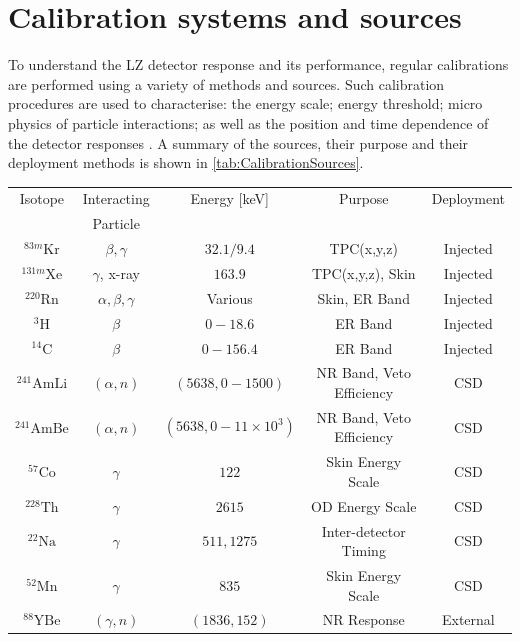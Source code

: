 \section{Calibration systems and sources}
To understand the LZ detector response and its performance, regular calibrations are performed using a variety of methods and sources. Such calibration procedures are used to characterise: the energy scale; energy threshold; micro physics of particle interactions; as well as the position and time dependence of the detector responses \cite{LZ:2024bsz}. A summary of the sources, their purpose and their deployment methods is shown in \autoref{tab:CalibrationSources}.
\begin{table}[h!]
    \centering
    \begin{tabular}{|c|c|c|c|c|}
         \hline
         Isotope & Interacting & Energy [keV] & Purpose & Deployment \\
         & Particle & & & \\
         \hline
         $^{83m}\text{Kr}$ & $\beta, \gamma$ & $32.1/9.4$ &TPC(x,y,z) & Injected\\
         $^{131m}\text{Xe}$& $\gamma$, x-ray & $163.9$ & TPC(x,y,z), Skin & Injected\\
         $^{220}\text{Rn}$& $\alpha,\beta,\gamma$ & Various \cite{Jorg:2023nvl} & Skin, ER Band & Injected\\
         $^{3}\text{H}$& $\beta$ & $0-18.6$ &ER Band & Injected\\
         $^{14}\text{C}$& $\beta$ & $0-156.4$ &ER Band & Injected\\
         $^{241}\text{AmLi}$& $(\alpha,n)$ & $(5638, 0-1500)$ & NR Band, Veto Efficiency & CSD\\
         $^{241}\text{AmBe}$& $(\alpha,n)$ & $(5638, 0-11\times10^{3})$ & NR Band, Veto Efficiency & CSD\\
         $^{57}\text{Co}$& $\gamma$ & $122$ &Skin Energy Scale & CSD\\
         $^{228}\text{Th}$& $\gamma$ & $2615$ &OD Energy Scale & CSD\\
         $^{22}\text{Na}$& $\gamma$ & $511, 1275$ &Inter-detector Timing & CSD\\
         $^{52}\text{Mn}$& $\gamma$ & $835$ &Skin Energy Scale & CSD\\
         $^{88}\text{YBe}$& $(\gamma,n)$ & $(1836,152)$ &NR Response & External\\

\end{tabular}
\end{table}
